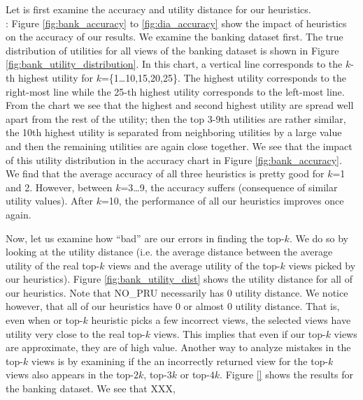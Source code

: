 Let is first examine the accuracy and utility distance for our heuristics. \\

:
Figure \ref{fig:bank_accuracy} to \ref{fig:dia_accuracy} show the impact of
heuristics on the accuracy of our results.
We examine the banking dataset first.
The true distribution of utilities for all views of the banking dataset is
shown in Figure \ref{fig:bank_utility_distribution}. 
In this chart, a vertical line corresponds to the $k$-th highest utility for
$k$=\{1\ldots10,15,20,25\}.
The highest utility corresponds to the right-most line while the 25-th highest
utility corresponds to the left-most line.
From the chart we see that the highest and second highest utility are spread
well apart from the rest of the utility; then the top 3-9th utilities are rather
similar, the 10th highest utility is separated from neighboring utilities by a
large value and then the remaining utilities are again close together.
We see that the impact of this utility distribution in the accuracy chart in
Figure \ref{fig:bank_accuracy}.
We find that the average accuracy of all three heuristics is pretty good for
$k$=1 and 2.
However, between $k$=3\ldots9, the accuracy suffers (consequence of similar
utility values).
After $k$=10, the performance of all our heuristics improves once again.

Now, let us examine how ``bad'' are our errors in finding the top-$k$.
We do so by looking at the utility distance (i.e. the average distance between
the average utility of the real top-$k$ views and the average utility of the
top-$k$ views picked by our heuristics).
Figure \ref{fig:bank_utility_dist} shows the utility distance for all of our
heuristics.
Note that NO\_PRU necessarily has 0 utility distance. 
We notice however, that all of our heuristics have 0 or almost 0 utility
distance.
That is, even when or top-$k$ heuristic picks a few incorrect views, the
selected views have utility very close to the real top-$k$ views.
This implies that even if our top-$k$ views are approximate, they are of high
value.
Another way to analyze mistakes in the top-$k$ views is by examining if the an
incorrectly returned view for the top-$k$ views also appears in the top-$2k$,
top-$3k$ or top-$4k$.
Figure \ref{} shows the results for the banking dataset.
We see that XXX,


